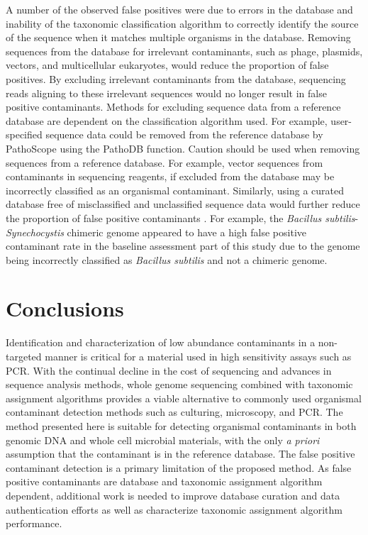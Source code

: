 \documentclass[fleqn,10pt,lineno]{wlpeerj}\usepackage[]{graphicx}\usepackage[]{color}
\begin{document}
A number of the observed false positives were due to errors in the database and inability of the taxonomic classification algorithm to correctly identify the source of the sequence when it matches multiple organisms in the database. 
Removing sequences from the database for irrelevant contaminants, such as phage, plasmids, vectors, and multicellular eukaryotes, would reduce the proportion of false positives.
By excluding irrelevant contaminants from the database, sequencing reads aligning to these irrelevant sequences would no longer result in false positive contaminants.
Methods for excluding sequence data from a reference database are dependent on the classification algorithm used.
For example, user-specified sequence data could be removed from the reference database by PathoScope using the PathoDB function.
Caution should be used when removing sequences from a reference database.
For example, vector sequences from contaminants in sequencing reagents, if excluded from the database may be incorrectly classified as an organismal contaminant.
Similarly, using a curated database free of misclassified and unclassified sequence data would further reduce the proportion of false positive contaminants \citep{tennessen2015prodege}.
For example, the \textit{Bacillus subtilis}-\textit{Synechocystis} chimeric genome appeared to have a high false positive contaminant rate in the baseline assessment part of this study due to the genome being incorrectly classified as \textit{Bacillus subtilis} and not a chimeric genome.


\section*{Conclusions}
Identification and characterization of low abundance contaminants in a non-targeted manner is critical for a material used in high sensitivity assays such as PCR.
With the continual decline in the cost of sequencing and advances in sequence analysis methods, whole genome sequencing combined with taxonomic assignment algorithms provides a viable alternative to commonly used organismal contaminant detection methods such as culturing, microscopy, and PCR.
The method presented here is suitable for detecting organismal contaminants in both genomic DNA and whole cell microbial materials, with the only \textit{a priori} assumption that the contaminant is in the reference database. 
The false positive contaminant detection is a primary limitation of the proposed method. 
As false positive contaminants are database and taxonomic assignment algorithm dependent, additional work is needed to improve database curation and data authentication efforts as well as characterize taxonomic assignment algorithm performance.
\end{document}
